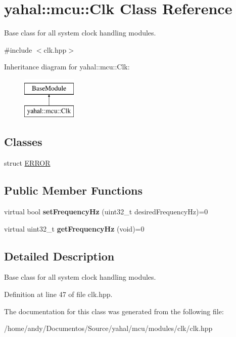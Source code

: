 \hypertarget{classyahal_1_1mcu_1_1_clk}{}\section{yahal\+:\+:mcu\+:\+:Clk Class Reference}
\label{classyahal_1_1mcu_1_1_clk}


Base class for all system clock handling modules.  




{\ttfamily \#include $<$clk.\+hpp$>$}

Inheritance diagram for yahal\+:\+:mcu\+:\+:Clk\+:\begin{figure}[H]
\begin{center}
\leavevmode
\includegraphics[height=2.000000cm]{classyahal_1_1mcu_1_1_clk}
\end{center}
\end{figure}
\subsection*{Classes}
\begin{DoxyCompactItemize}
\item 
struct \hyperlink{structyahal_1_1mcu_1_1_clk_1_1_e_r_r_o_r}{E\+R\+R\+O\+R}
\end{DoxyCompactItemize}
\subsection*{Public Member Functions}
\begin{DoxyCompactItemize}
\item 
\hypertarget{classyahal_1_1mcu_1_1_clk_a6623c951307778c2e48a096bb5c4804a}{}virtual bool {\bfseries set\+Frequency\+Hz} (uint32\+\_\+t desired\+Frequency\+Hz)=0\label{classyahal_1_1mcu_1_1_clk_a6623c951307778c2e48a096bb5c4804a}

\item 
\hypertarget{classyahal_1_1mcu_1_1_clk_a402906c8635bdbf999d4b13895e42ff2}{}virtual uint32\+\_\+t {\bfseries get\+Frequency\+Hz} (void)=0\label{classyahal_1_1mcu_1_1_clk_a402906c8635bdbf999d4b13895e42ff2}

\end{DoxyCompactItemize}


\subsection{Detailed Description}
Base class for all system clock handling modules. 

Definition at line 47 of file clk.\+hpp.



The documentation for this class was generated from the following file\+:\begin{DoxyCompactItemize}
\item 
/home/andy/\+Documentos/\+Source/yahal/mcu/modules/clk/clk.\+hpp\end{DoxyCompactItemize}
